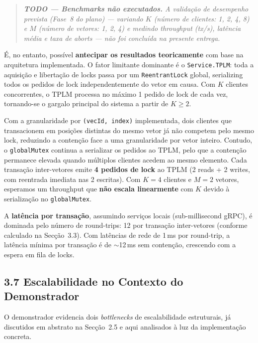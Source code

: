\begin{quote}
\textit{\textbf{TODO --- Benchmarks não executados.}
A validação de desempenho prevista (Fase~8 do plano) --- variando $K$ (número de clientes:
1, 2, 4, 8) e $M$ (número de vetores: 1, 2, 4) e medindo throughput (tx/s), latência média
e taxa de aborts --- não foi concluída na presente entrega.}
\end{quote}

É, no entanto, possível \textbf{antecipar os resultados teoricamente} com base na arquitetura
implementada. O fator limitante dominante é o \texttt{Service.TPLM}: toda a aquisição e
libertação de locks passa por um \texttt{ReentrantLock} global, serializing todos os pedidos
de lock independentemente do vetor em causa. Com $K$ clientes concorrentes, o TPLM processa
no máximo 1 pedido de lock de cada vez, tornando-se o gargalo principal do sistema a partir de
$K \geq 2$.

Com a granularidade por \texttt{(vecId,~index)} implementada, dois clientes que transacionem
em posições distintas do mesmo vetor já não competem pelo mesmo lock, reduzindo a contenção
face a uma granularidade por vetor inteiro. Contudo, o \texttt{globalMutex} continua a
serializar os pedidos ao TPLM, pelo que a contenção permanece elevada quando múltiplos
clientes acedem ao mesmo elemento. Cada transação inter-vetores emite \textbf{4 pedidos de
lock} ao TPLM (2 reads + 2 writes, com reentrada imediata nas 2 escritas). Com $K=4$
clientes e $M=2$ vetores, esperamos um throughput que \textbf{não escala linearmente}
com $K$ devido à serialização no \texttt{globalMutex}.

A \textbf{latência por transação}, assumindo serviços locais (sub-millisecond gRPC), é
dominada pelo número de round-trips: 12 por transação inter-vetores (conforme calculado na
Secção~3.3). Com latências de rede de 1\,ms por round-trip, a latência mínima por transação
é de $\sim$12\,ms sem contenção, crescendo com a espera em fila de locks.

\subsection*{3.7 Escalabilidade no Contexto do Demonstrador}

O demonstrador evidencia dois \textit{bottlenecks} de escalabilidade estruturais, já
discutidos em abstrato na Secção~2.5 e aqui analisados à luz da implementação concreta.

